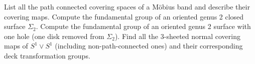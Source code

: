 \documentclass{exam}
\begin{document}
\centering
{}
\vspace{1em}

\begin{questions}
    \question
        List all the path connected covering spaces of a Möbius band and describe their covering maps.
    \question
        Compute the fundamental group of an oriented genus 2 closed surface $\Sigma_2$.
    \question
        Compute the fundamental group of an oriented genus 2 surface with one hole (one disk removed from $\Sigma_2$).
    \question
        Find all the 3-sheeted normal covering maps of $S^1 \vee S^1$ (including non-path-connected ones) and their corresponding deck transformation groups.
\end{questions}
\end{document}
